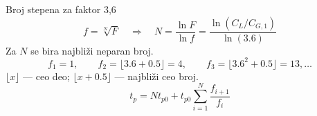 \begin{frame}[label=09_3-s021]{Broj stepena za faktor 3,6}
\[f=\sqrt[N]F\quad\Longrightarrow\quad
N=\frac{\ln F}{\ln f}=\frac{\ln(C_L/C_{G,1})}{\ln(3.6)}\]
Za $N$ se bira najbliži neparan broj.
\[f_1=1,\qquad f_2=\lfloor3.6+0.5\rfloor=4,\qquad
f_3=\lfloor3.6^2+0.5\rfloor=13,\ldots\]
$\lfloor x\rfloor$ — ceo deo; $\lfloor x+0.5\rfloor$ — najbliži ceo broj.
\[t_p=Nt_{p0}+t_{p0}\sum_{i=1}^N\frac{f_{i+1}}{f_i}\]
\end{frame}
